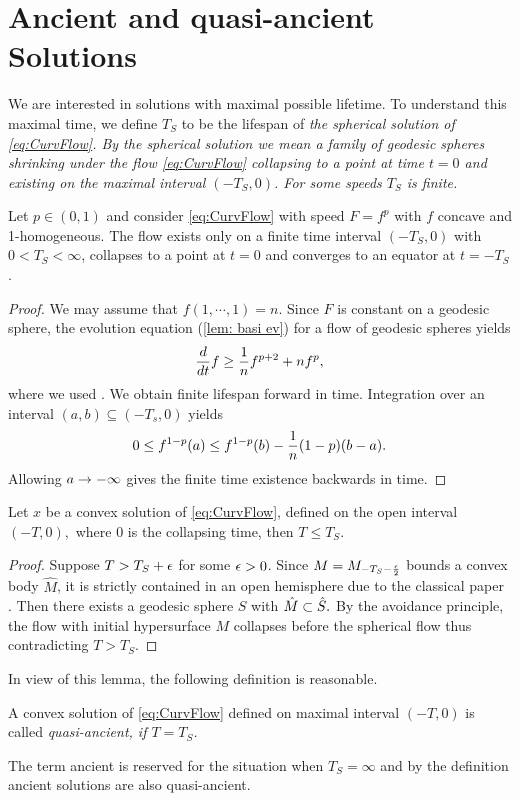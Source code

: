 \documentclass{amsart}
\begin{document}
\section{Ancient and quasi-ancient Solutions}\label{quasi}
We are interested in solutions with maximal possible lifetime. To understand this maximal time, we define $T_S$ to be the lifespan of \it{the spherical solution} of \eqref{eq:CurvFlow}. By the spherical solution we mean a family of geodesic spheres shrinking under the flow \eqref{eq:CurvFlow} collapsing to a point at time $t=0$ and existing on the maximal interval \((-T_S, 0)\). For some speeds \(T_S\) is finite.
\begin{lemma}
 Let $p\in(0,1)$ and consider \eqref{eq:CurvFlow} with speed \(F = f^p\) with \(f\) concave and 1-homogeneous. The flow exists only on a finite time interval \((-T_S,0)\) with \(0 < T_S < \infty\), collapses to a point at \(t=0\) and converges to an equator at \(t=-T_S\).
\end{lemma}
\begin{proof}
We may assume that $f(1,\cdots,1)=n.$
Since $F$ is constant on a geodesic sphere, the evolution equation (\ref{lem: basi ev}) for a flow of geodesic spheres yields
$$\frac{d}{dt}f\geq \frac{1}{n} f^{p+2}+ nf^{p},$$
where we used \cite[Lemma~2.2.19, Lemma~2.2.20]{Gerhardt:/2006}.
We obtain finite lifespan forward in time. Integration over an interval $(a,b) \subseteq (-T_s, 0)$ yields
$$0\leq f^{1-p}(a)\leq f^{1-p}(b)-\frac{1}{n}(1-p)(b-a).$$
Allowing $a\rightarrow-\infty$ gives the finite time existence backwards in time.
\end{proof}
\begin{lemma}
Let $x$ be a convex solution of \eqref{eq:CurvFlow}, defined on the open interval $(-T,0),$ where $0$ is the collapsing time, then $T\leq T_S.$
\end{lemma}
\begin{proof}
Suppose $T>T_S+\epsilon$ for some $\epsilon>0$. Since $M=M_{-T_S-\frac{\epsilon}{2}}$ bounds a convex body $\hat{M}$, it is strictly contained in an open hemisphere due to the classical paper \cite{CarmoWarner:/1970}. Then there exists a geodesic sphere $S$ with $\hat{M}\subset\hat{S}.$ By the avoidance principle, the flow with initial hypersurface $M$ collapses before the spherical flow thus contradicting $T>T_S$.
\end{proof}
In view of this lemma, the following definition is reasonable.
\begin{defn}
A convex solution of \eqref{eq:CurvFlow} defined on maximal interval $(-T,0)$ is called \it{quasi-ancient}, if $T=T_S$.
\end{defn}
The term ancient is reserved for the situation when \(T_S=\infty\) and by the definition ancient solutions are also quasi-ancient.
\end{document}

